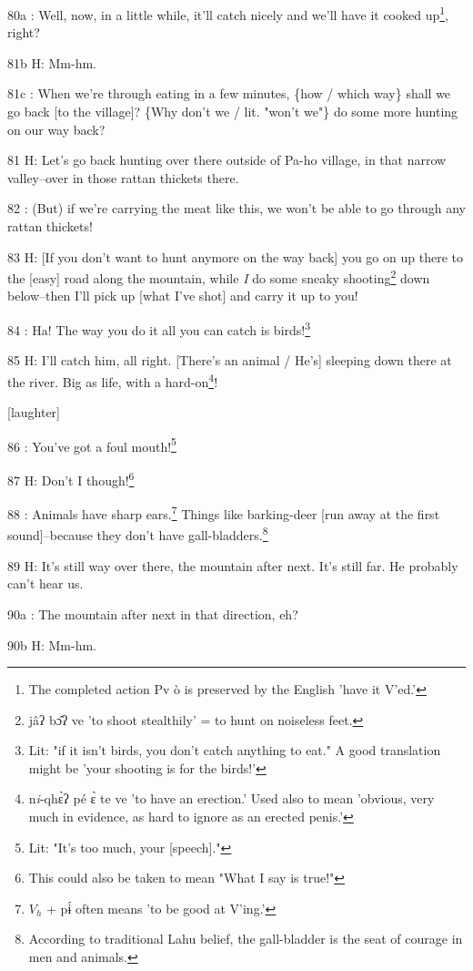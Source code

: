 80a  : Well, now, in a little while, it'll catch nicely and we'll have it cooked
up\footnote{The completed action Pv ò is preserved by the English 'have it V'ed.'}, right?

81b H: Mm-hm.

81c  : When we're through eating in a few minutes, \{how / which way\} shall we
go back [to the village]? \{Why don't we / lit. "won't we"\}
do some more hunting on our way back?

81 H: Let's go back hunting over there outside of Pa-ho village, in that narrow
valley--over in those rattan thickets there.

82  : (But) if we're carrying the meat like this, we won't be able to go through
any rattan thickets!

83 H: [If you don't want to hunt anymore on the way back] you go on up there to
the [easy] road along the mountain, while \textit{I} do some sneaky shooting\footnote{jâʔ bɔ̂ʔ ve 'to shoot stealthily' = to hunt on noiseless feet.}
down below--then I'll pick up [what I've shot] and carry it up to you!

84  : Ha! The way you do it all you can catch is birds!\footnote{Lit: "if it isn't birds, you don't catch anything to eat." A good translation might be 'your shooting is for the birds!'}

85 H: I'll catch him, all right. [There's an animal / He's] sleeping down there
at the river. Big as life, with a hard-on\footnote{n\emph{i}-qhɛ̀ʔ pé ɛ̀ te ve 'to have an erection.' Used also to mean 'obvious, very much in evidence, as hard to ignore as an erected penis.'}!

[laughter]

86  : You've got a foul mouth!\footnote{Lit: "It's too much, your [speech]."}

87 H: Don't I though!\footnote{This could also be taken to mean "What I say is true!"}

88  : Animals have sharp ears.\footnote{$V_h$ + pɨ́ often means 'to be good at V'ing.'} Things like barking-deer [run away at the first
sound]--because they don't have gall-bladders.\footnote{According to traditional Lahu belief, the gall-bladder is the seat of courage in men and animals.}

89 H: It's still way over there, the mountain after next. It's still far. He probably
can't hear us.

90a  : The mountain after next in that direction, eh?

90b H: Mm-hm.

